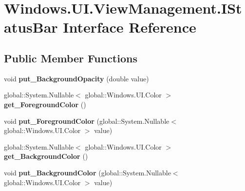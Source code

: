 \hypertarget{interface_windows_1_1_u_i_1_1_view_management_1_1_i_status_bar}{}\section{Windows.\+U\+I.\+View\+Management.\+I\+Status\+Bar Interface Reference}
\label{interface_windows_1_1_u_i_1_1_view_management_1_1_i_status_bar}
\subsection*{Public Member Functions}
\begin{DoxyCompactItemize}
\item 
\mbox{\label{interface_windows_1_1_u_i_1_1_view_management_1_1_i_status_bar_af58d730803477f79f79eadd2a909a319}} 
void {\bfseries put\+\_\+\+Background\+Opacity} (double value)
\item 
\mbox{\label{interface_windows_1_1_u_i_1_1_view_management_1_1_i_status_bar_af79d7da2c641f838f1b1ecf0141d571b}} 
global\+::\+System.\+Nullable$<$ global\+::\+Windows.\+U\+I.\+Color $>$ {\bfseries get\+\_\+\+Foreground\+Color} ()
\item 
\mbox{\label{interface_windows_1_1_u_i_1_1_view_management_1_1_i_status_bar_a03c9739bb308ccc616d87f58bc05687f}} 
void {\bfseries put\+\_\+\+Foreground\+Color} (global\+::\+System.\+Nullable$<$ global\+::\+Windows.\+U\+I.\+Color $>$ value)
\item 
\mbox{\label{interface_windows_1_1_u_i_1_1_view_management_1_1_i_status_bar_a9df6bc15ee0dfa95e094167c8cce06b0}} 
global\+::\+System.\+Nullable$<$ global\+::\+Windows.\+U\+I.\+Color $>$ {\bfseries get\+\_\+\+Background\+Color} ()
\item 
\mbox{\label{interface_windows_1_1_u_i_1_1_view_management_1_1_i_status_bar_a8bbd89095cf7637143e01eeacd3b8718}} 
void {\bfseries put\+\_\+\+Background\+Color} (global\+::\+System.\+Nullable$<$ global\+::\+Windows.\+U\+I.\+Color $>$ value)

\end{DoxyCompactItemize}
